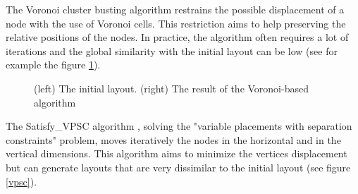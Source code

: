 \documentclass[12pt]{report}
\begin{document}
The Voronoi cluster busting algorithm \cite{Gansner98} restrains the possible displacement of a node with the use of Voronoi cells. This restriction aims to help preserving the relative positions of the nodes. In practice, the algorithm often requires a lot of iterations and the global similarity with the initial layout can be low (see for example the figure \ref{voronoi}).

\begin{figure}[h]
  \setlength\fboxsep{5pt}
  \setlength\fboxrule{0.5pt}
  \caption{(left) The initial layout. (right) The result of the Voronoi-based algorithm}
  \label{voronoi}
\end{figure}

The Satisfy\_VPSC algorithm \cite{VPSC06}, solving the "variable placements with separation constraints" problem, moves iteratively the nodes in the horizontal and in the vertical dimensions. This algorithm aims to minimize the vertices displacement but can generate layouts that are very dissimilar to the initial layout (see figure \ref{vpsc}).
\end{document}
